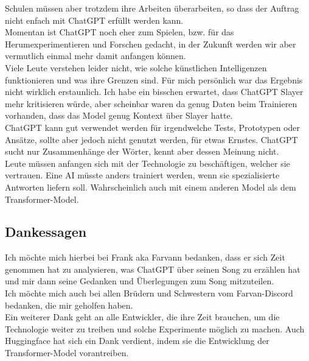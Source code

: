 \documentclass[twocolumn,10pt]{article}
\begin{document}
	Schulen müssen aber trotzdem ihre Arbeiten überarbeiten, so dass der Auftrag nicht enfach mit ChatGPT erfüllt werden kann.\\
	Momentan ist ChatGPT noch eher zum Spielen, bzw. für das Herumexperimentieren und Forschen gedacht, in der Zukunft werden wir aber vermutlich einmal mehr damit anfangen können.\\
	Viele Leute verstehen leider nicht, wie solche künstlichen Intelligenzen funktionieren und was ihre Grenzen sind. Für mich persönlich war das Ergebnis nicht wirklich erstaunlich. Ich habe ein bisschen erwartet, dass ChatGPT Slayer mehr kritisieren würde, aber scheinbar waren da genug Daten beim Trainieren vorhanden, dass das Model genug Kontext über Slayer hatte.\\	
	ChatGPT kann gut verwendet werden für irgendwelche Tests, Prototypen oder Ansätze, sollte aber jedoch nicht genutzt werden, für etwas Ernstes. ChatGPT sucht nur Zusammenhänge der Wörter, kennt aber dessen Meinung nicht.\\	
	Leute müssen anfangen sich mit der Technologie zu beschäftigen, welcher sie vertrauen. Eine AI müsste anders trainiert werden, wenn sie spezialisierte Antworten liefern soll. Wahrscheinlich auch mit einem anderen Model als dem Transformer-Model. 
	\clearpage

	


	\onecolumn	\listoffigures{}
	\printbibliography[title=Quellenverzeichnis]
	\clearpage
	
	\subsection{Dankessagen}
	Ich möchte mich hierbei bei Frank aka Farvann bedanken, dass er sich Zeit genommen hat zu analysieren, was ChatGPT über seinen Song zu erzählen hat und mir dann seine Gedanken und Überlegungen zum Song  mitzuteilen.\\
	Ich möchte mich auch bei allen Brüdern und Schwestern vom Farvan-Discord bedanken, die mir geholfen haben.\\
	Ein weiterer Dank geht an alle Entwickler, die ihre Zeit brauchen, um die Technologie weiter zu treiben und solche Experimente möglich zu machen. Auch Huggingface hat sich ein Dank verdient, indem sie die Entwicklung der Transformer-Model vorantreiben.
	
	\clearpage	
	\onehalfspacing
\end{document}
